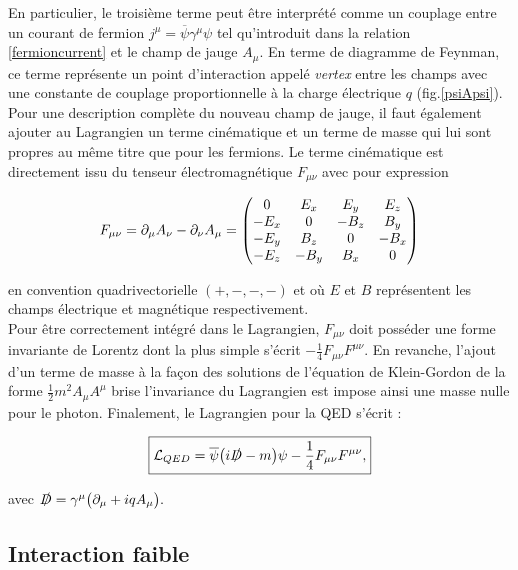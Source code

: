         En particulier, le troisième terme peut être interprété comme un couplage entre un courant de fermion $j^{\mu}=\overline{\psi}\gamma^{\mu}\psi$ tel qu'introduit dans la relation \ref{fermioncurrent} et le champ de jauge $A_{\mu}$. En terme de diagramme de Feynman, ce terme représente un point d'interaction appelé \textit{vertex} entre les champs avec une constante de couplage proportionnelle à la charge électrique $q$ (fig.\ref{psiApsi}). Pour une description complète du nouveau champ de jauge, il faut également ajouter au Lagrangien un terme cinématique et un terme de masse qui lui sont propres au même titre que pour les fermions. Le terme cinématique est directement issu du tenseur électromagnétique $F_{\mu\nu}$ avec pour expression 

        \begin{equation}
            F_{\mu\nu} = \partial_{\mu}A_{\nu}-\partial_{\nu}A_{\mu} 
                       =  \mqty(0 & E_x & E_y & E_z \\ 
                               -E_x & 0 & -B_z & B_y \\
                               -E_y & B_z & 0 & -B_x \\
                               -E_z & -B_y & B_x & 0)
        \end{equation}

        en convention quadrivectorielle $(+,-,-,-)$ et où $E$ et $B$ représentent les champs électrique et magnétique respectivement. \\
        
        Pour être correctement intégré dans le Lagrangien, $F_{\mu\nu}$ doit posséder une forme invariante de Lorentz dont la plus simple s'écrit $-\frac{1}{4}F_{\mu\nu}F^{\mu\nu}$. En revanche, l'ajout d'un terme de masse à la façon des solutions de l'équation de Klein-Gordon de la forme $\frac{1}{2}m^2A_{\mu}A^{\mu}$ brise l'invariance du Lagrangien est impose ainsi une masse nulle pour le photon. Finalement, le Lagrangien pour la QED s'écrit :

        \begin{equation}
            \boxed{\mathcal{L}_{\tiny QED} = \overline{\psi}\bigl(i\slashed{D}-m\bigr)\psi - \frac{1}{4}F_{\mu\nu}F^{\mu\nu},}
        \end{equation}

        avec $\slashed D = \gamma^{\mu}\bigl(\partial_{\mu}+iqA_{\mu}\bigr).$

        \subsection{Interaction faible}
        \label{weakinter}

